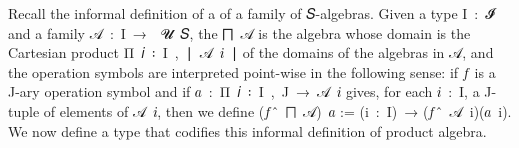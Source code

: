 Recall the informal definition of a  of a family of \ab 𝑆-algebras. Given a type \ab I~\as :~\ab 𝓘\af ̇ and a family \ab 𝒜~\as :~\ab I~\as →~~\ab 𝓤~\ab 𝑆, the  \af ⨅~\ab 𝒜 is the algebra whose domain is the Cartesian product \af Π~\ab 𝑖~\as ꞉~\ab I~\af ,~\af ∣~\ab 𝒜~\ab 𝑖~\af ∣ of the domains of the algebras in \ab 𝒜, and the operation symbols are interpreted point-wise in the following sense: if \ab 𝑓 is a \ab J-ary operation symbol and if \ab 𝑎~\as :~\af Π~\ab 𝑖~\as ꞉~\ab I~\af ,~\ab J~\as →~\ab 𝒜~\ab 𝑖 gives, for each \ab 𝑖~\as :~\ab I, a \ab J-tuple of elements of \ab 𝒜~\ab 𝑖, then we define (\ab 𝑓~\af ̂~\af ⨅~\ab 𝒜)~\ab 𝑎 := (\ab i~\as :~\ab I)~\as → (\ab 𝑓~\af ̂~\ab 𝒜~\ab i)(\ab 𝑎~\ab i). We now define a type that codifies this informal definition of product algebra.
\ccpad
\begin{code}%
\>[0][@{}l@{\AgdaIndent{0}}]%
\>[1]\AgdaSpace{}%
\AgdaSymbol{:}\AgdaSpace{}%
\AgdaSymbol{(}\AgdaSpace{}%
\AgdaSymbol{:}\AgdaSpace{}%
\AgdaSpace{}%
\AgdaSpace{}%
\AgdaSpace{}%
\AgdaSpace{}%
\AgdaSpace{}%
\AgdaSymbol{)}\AgdaSpace{}%
\AgdaSpace{}%
\AgdaSpace{}%
\AgdaSymbol{(}\AgdaSpace{}%
\AgdaSpace{}%
\AgdaSymbol{)}\AgdaSpace{}%
\<%
\\
%
\\[\AgdaEmptyExtraSkip]%
%
\>[1]\AgdaSpace{}%
\AgdaSpace{}%
\AgdaSymbol{=}%
\>[51I]\AgdaSymbol{(}\AgdaSpace{}%
\AgdaSpace{}%
\AgdaSpace{}%
\AgdaSpace{}%
\AgdaFunction{,}\AgdaSpace{}%
\AgdaSpace{}%
\AgdaSpace{}%
\AgdaSpace{}%
\AgdaSymbol{)}\AgdaSpace{}%
\AgdaOperator{\AgdaInductiveConstructor{,}}%
\>[43]\<%
\\
\>[.][@{}l@{}]\<[51I]%
\>[7]\AgdaSpace{}%
\AgdaSpace{}%
\AgdaSpace{}%
\AgdaSpace{}%
\AgdaSpace{}%
\AgdaSymbol{(}\AgdaSpace{}%
\AgdaSpace{}%
\AgdaSpace{}%
\AgdaSymbol{)}\AgdaSpace{}%
\AgdaSpace{}%
\AgdaSpace{}%
\AgdaSpace{}%
\AgdaSpace{}%
\AgdaSpace{}%
%
\>[43]\<%
\end{code}
